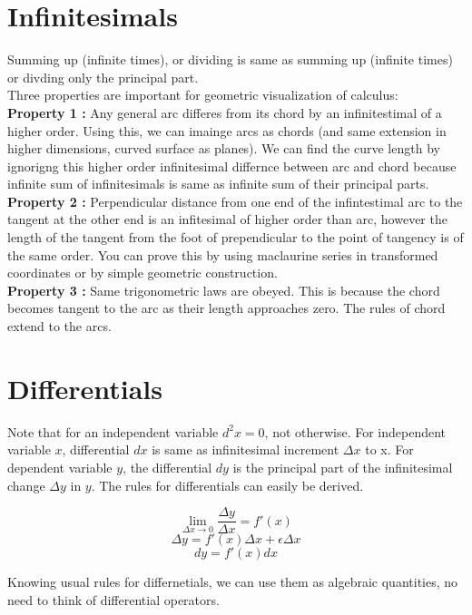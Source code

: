 \documentclass{report}
\begin{document}
\section{Infinitesimals}
Summing up (infinite times), or dividing is same as summing up (infinite times) or divding only the principal part.\\

\noindent Three properties are important for geometric visualization of calculus:\\

\noindent \textbf{Property 1 :} Any general arc differes from its chord by an infinitestimal of a higher order. Using this, we can imainge arcs as chords (and same extension in higher dimensions, curved surface as planes). We can find the curve length by ignorigng this higher order infinitesimal differnce between arc and chord because infinite sum of infinitesimals is same as infinite sum of their principal parts.\\

\noindent \textbf{Property 2 :} Perpendicular distance from one end of the infintestimal arc to the tangent at the other end  is an infitesimal of higher order than arc, however the length of the tangent from the foot of prependicular to the point of tangency is of the same order. You can prove this by using maclaurine series in transformed coordinates or by simple geometric construction.\\

\noindent \textbf{Property 3 :} Same trigonometric laws are obeyed. This is because the chord becomes tangent to the arc as their length approaches zero. The rules of chord extend to the arcs.

\section{Differentials}

Note that for an independent variable $d^2x = 0$, not otherwise. For independent variable $x$, differential $dx$ is same as infinitesimal increment $\Delta x$ to x. For dependent variable $y$, the differential $dy$ is the principal part of the infinitesimal change $\Delta y$ in $y$. The rules for differentials can easily be derived.

$$\lim_{\Delta x\to 0} \frac{\Delta y}{\Delta x} = f'(x)$$
$$\Delta y = f'(x)\Delta x + \epsilon\Delta x$$
$$dy = f'(x)dx$$

\noindent Knowing usual rules for differnetials, we can use them as algebraic quantities, no need to think of differential operators.\\
\end{document}
